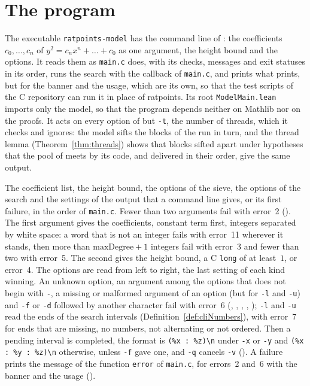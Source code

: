 \section{The program}\label{sec:outputProgram}

The executable \verb|ratpoints-model| has the command line of \ratpoints{}: the coefficients
$c_0, \dots, c_n$ of $y^2 = c_n x^n + \dots + c_0$ as one argument, the height bound and the
options. It reads them as \verb|main.c| does, with its checks, messages and exit statuses in its
order, runs the search with the callback of \verb|main.c|, and prints what \ratpoints{} prints, but
for the banner and the usage, which are its own, so that the test scripts of the C repository can
run it in place of ratpoints. Its root \verb|ModelMain.lean| imports only the model, so that the
program depends neither on Mathlib nor on the proofs. It acts on every option of \ratpoints{} but
\verb|-t|, the number of threads, which it checks and ignores: the model sifts the blocks of the run
in turn, and the thread lemma (Theorem~\ref{thm:threads}) shows that blocks sifted apart under
hypotheses that the pool of \ratpoints{} meets by its code, and delivered in their order, give the
same output.

\begin{definition}\label{def:cliInput}
  \leanok
  The coefficient list, the height bound, the options of the sieve, the options of the search and
  the settings of the output that a command line gives, or its first failure, in the order of
  \verb|main.c|. Fewer than two arguments fail with error~2 (). The first
  argument gives the coefficients, constant term first, integers separated by white space: a word
  that is not an integer fails with error~11 wherever it stands, then more than
  $\mathrm{maxDegree} + 1$ integers fail with error~3 and fewer than two with error~5. The second
  gives the height bound, a C \verb|long| of at least~$1$, or error~4. The options are read from
  left to right, the last setting of each kind winning. An unknown option, an argument among the
  options that does not begin with \verb|-|, a missing or malformed argument of an option (but for
  \verb|-l| and \verb|-u|) and \verb|-f| or \verb|-d| followed by another character fail with
  error~6 (, , ,
  , ); \verb|-l| and \verb|-u| read the ends of
  the search intervals (Definition~\ref{def:cliNumbers}), with error~7 for ends that are missing, no
  numbers, not alternating or not ordered. Then a pending interval is completed, the
  format is \verb|(%x : %z)\n| under \verb|-x| or \verb|-y| and \verb|(%x : %y : %z)\n| otherwise,
  unless \verb|-f| gave one, and \verb|-q| cancels \verb|-v| (). A failure
  prints the message of the function \verb|error| of \verb|main.c|, for errors~2 and~6 with the
  banner and the usage ().
\end{definition}

